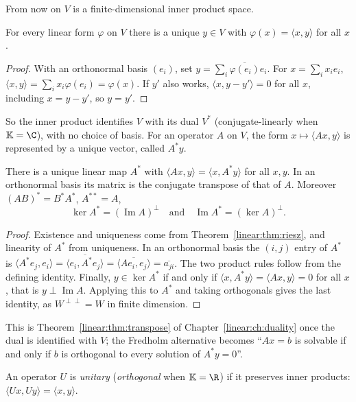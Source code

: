 From now on $V$ is a finite-dimensional inner product space.

\begin{theorem}\label{linear:thm:riesz}
For every linear form $\varphi$ on $V$ there is a unique $y\in V$ with $\varphi(x)=\langle x,y\rangle$ for all $x$.
\end{theorem}
\begin{proof}
With an orthonormal basis $(e_i)$, set $y=\sum_i\overline{\varphi(e_i)}e_i$. For $x=\sum_ix_ie_i$,
$\langle x,y\rangle=\sum_ix_i\varphi(e_i)=\varphi(x)$. If $y'$ also works, $\langle x,y-y'\rangle=0$ for all $x$, including
$x=y-y'$, so $y=y'$.
\end{proof}

So the inner product identifies $V$ with its dual $V^*$ (conjugate-linearly when $\mathbb K=\C$), with no choice of basis.
For an operator $A$ on $V$, the form $x\mapsto\langle Ax,y\rangle$ is represented by a unique vector, called $A^*y$.

\begin{proposition}\label{linear:prop:adjoint}
There is a unique linear map $A^*$ with $\langle Ax,y\rangle=\langle x,A^*y\rangle$ for all $x,y$. In an orthonormal
basis its matrix is the conjugate transpose of that of $A$. Moreover $(AB)^*=B^*A^*$, $A^{**}=A$,
\[
\ker A^*=(\operatorname{Im}A)^\perp\quad\text{and}\quad\operatorname{Im}A^*=(\ker A)^\perp.
\]
\end{proposition}
\begin{proof}
Existence and uniqueness come from Theorem~\ref{linear:thm:riesz}, and linearity of $A^*$ from uniqueness. In an orthonormal
basis the $(i,j)$ entry of $A^*$ is $\langle A^*e_j,e_i\rangle=\overline{\langle e_i,A^*e_j\rangle}=\overline{\langle
Ae_i,e_j\rangle}=\overline{a_{ji}}$. The two product rules follow from the defining identity. Finally, $y\in\ker A^*$ if
and only if $\langle x,A^*y\rangle=\langle Ax,y\rangle=0$ for all $x$, that is $y\perp\operatorname{Im}A$. Applying this to
$A^*$ and taking orthogonals gives the last identity, as $W^{\perp\perp}=W$ in finite dimension.
\end{proof}

This is Theorem~\ref{linear:thm:transpose} of Chapter~\ref{linear:ch:duality} once the dual is identified with $V$; the Fredholm
alternative becomes ``$Ax=b$ is solvable if and only if $b$ is orthogonal to every solution of $A^*y=0$''.

An operator $U$ is \emph{unitary} (\emph{orthogonal} when $\mathbb K=\R$) if it preserves inner products:
$\langle Ux,Uy\rangle=\langle x,y\rangle$.

